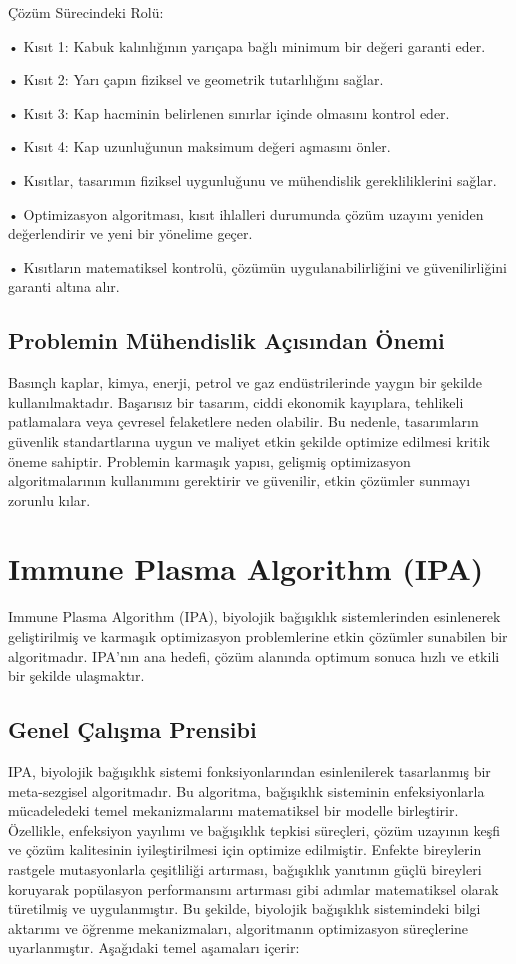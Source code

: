 \documentclass[12pt,a4paper]{article}
\begin{document}
Çözüm Sürecindeki Rolü:

•	Kısıt 1: Kabuk kalınlığının yarıçapa bağlı minimum bir değeri garanti eder.

•	Kısıt 2: Yarı çapın fiziksel ve geometrik tutarlılığını sağlar.

•	Kısıt 3: Kap hacminin belirlenen sınırlar içinde olmasını kontrol eder.

•	Kısıt 4: Kap uzunluğunun maksimum değeri aşmasını önler.


•	Kısıtlar, tasarımın fiziksel uygunluğunu ve mühendislik gerekliliklerini sağlar.

•	Optimizasyon algoritması, kısıt ihlalleri durumunda çözüm uzayını yeniden değerlendirir ve yeni bir yönelime geçer.

•	Kısıtların matematiksel kontrolü, çözümün uygulanabilirliğini ve güvenilirliğini garanti altına alır.
\subsection{Problemin Mühendislik Açısından Önemi}
Basınçlı kaplar, kimya, enerji, petrol ve gaz endüstrilerinde yaygın bir şekilde kullanılmaktadır. Başarısız bir tasarım, ciddi ekonomik kayıplara, tehlikeli patlamalara veya çevresel felaketlere neden olabilir. Bu nedenle, tasarımların güvenlik standartlarına uygun ve maliyet etkin şekilde optimize edilmesi kritik öneme sahiptir. Problemin karmaşık yapısı, gelişmiş optimizasyon algoritmalarının kullanımını gerektirir ve güvenilir, etkin çözümler sunmayı zorunlu kılar.

\section{Immune Plasma Algorithm (IPA)}

Immune Plasma Algorithm (IPA), biyolojik bağışıklık sistemlerinden esinlenerek geliştirilmiş ve karmaşık optimizasyon problemlerine etkin çözümler sunabilen bir algoritmadır. IPA’nın ana hedefi, çözüm alanında optimum sonuca hızlı ve etkili bir şekilde ulaşmaktır.
\subsection{Genel Çalışma Prensibi}
IPA, biyolojik bağışıklık sistemi fonksiyonlarından esinlenilerek tasarlanmış bir meta-sezgisel algoritmadır. Bu algoritma, bağışıklık sisteminin enfeksiyonlarla mücadeledeki temel mekanizmalarını matematiksel bir modelle birleştirir. Özellikle, enfeksiyon yayılımı ve bağışıklık tepkisi süreçleri, çözüm uzayının keşfi ve çözüm kalitesinin iyileştirilmesi için optimize edilmiştir. Enfekte bireylerin rastgele mutasyonlarla çeşitliliği artırması, bağışıklık yanıtının güçlü bireyleri koruyarak popülasyon performansını artırması gibi adımlar matematiksel olarak türetilmiş ve uygulanmıştır. Bu şekilde, biyolojik bağışıklık sistemindeki bilgi aktarımı ve öğrenme mekanizmaları, algoritmanın optimizasyon süreçlerine uyarlanmıştır. 
Aşağıdaki temel aşamaları içerir:
\end{document}
